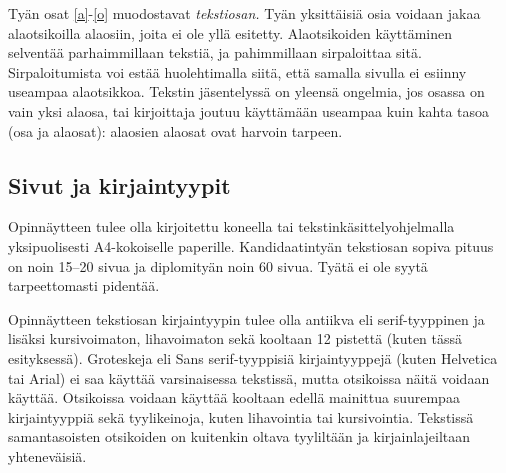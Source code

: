 \documentclass[english,12pt,a4paper,pdftex]{article}
\begin{document}
Tyän osat \ref{a}-\ref{o} muodostavat \textit{tekstiosan.}  Tyän
yksittäisiä osia voidaan jakaa alaotsikoilla alaosiin, joita ei ole
yllä esitetty. Alaotsikoiden käyttäminen selventää parhaimmillaan
tekstiä, ja pahimmillaan sirpaloittaa sitä.  Sirpaloitumista voi estää
huolehtimalla siitä, että samalla sivulla ei esiinny useampaa
alaotsikkoa.  Tekstin jäsentelyssä on yleensä ongelmia, jos osassa on
vain yksi alaosa, tai kirjoittaja joutuu käyttämään useampaa kuin
kahta tasoa (osa ja alaosat): alaosien alaosat ovat harvoin tarpeen.
\subsection*{Sivut ja kirjaintyypit}

Opinnäytteen tulee olla kirjoitettu koneella tai
tekstinkäsittelyohjelmalla yksipuolisesti A4-kokoiselle paperille.
Kandidaatintyän tekstiosan sopiva pituus on noin 15--20 sivua ja
diplomityän noin 60 sivua. Tyätä ei ole syytä tarpeettomasti pidentää.

Opinnäytteen tekstiosan kirjaintyypin tulee olla antiikva eli
serif\--tyyp\-pi\-nen ja lisäksi kursivoimaton, lihavoimaton sekä kooltaan 12
pistettä (kuten tässä esityksessä). Groteskeja eli \textsf{Sans
  serif}-tyyppisiä kirjaintyyppejä (kuten Helvetica tai Arial) ei saa
käyttää varsinaisessa tekstissä, mutta otsikoissa näitä voidaan
käyttää.  Otsikoissa voidaan käyttää kooltaan edellä mainittua
suurempaa kirjaintyyppiä sekä tyylikeinoja, kuten lihavointia tai
kursivointia.  Tekstissä samantasoisten otsikoiden on kuitenkin oltava
tyyliltään ja kirjainlajeiltaan yhteneväisiä.


\begin{table}[htb]
\caption{Taulukoissa ja kuvissa kirjaintyypin voi valita
tarkoituksenmukaisesti, mutta kuva- ja taulukkoteksteissä tulee
käyttää samaa kirjaintyyppiä kuin varsinaisessa tekstissä.
Huomaa taulukon numeroinnin sijoittuminen taulukon yläpuolelle. \label{taulukko1}}
\begin{center}
\end{center}
\end{table}
\end{document}
